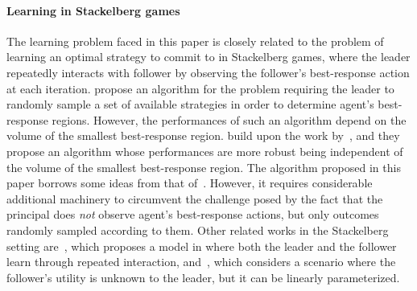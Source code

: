 \paragraph{Learning in Stackelberg games}
%
The learning problem faced in this paper is closely related to the problem of learning an optimal strategy to commit to in Stackelberg games, where the leader repeatedly interacts with follower by observing the follower's best-response action at each iteration.
%
\citet{letchford2009learning} propose an algorithm for the problem requiring the leader to randomly sample a set of available strategies in order to determine agent's best-response regions.
%
However, the performances of such an algorithm depend on the volume of the smallest best-response region.
%
\citet{peng2019optimal} build upon the work by~\citet{letchford2009learning}, and they propose an algorithm whose performances are more robust being independent of the volume of the smallest best-response region.
%
The algorithm proposed in this paper borrows some ideas from that of~\citet{peng2019optimal}.
%
However, it requires considerable additional machinery to circumvent the challenge posed by the fact that the principal does \emph{not} observe agent's best-response actions, but only outcomes randomly sampled according to them.
%
%
%
%
Other related works in the Stackelberg setting are~\citep{bai2021sample}, which proposes a model in where both the leader and the follower learn through repeated interaction, and~\citep{lauffer2022noregret}, which considers a scenario where the follower’s utility is unknown to the leader, but it can be linearly parameterized.
